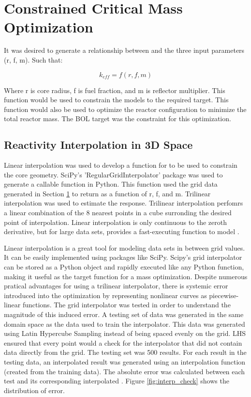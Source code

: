 \section{Constrained Critical Mass Optimization}\label{sec:crit_rad_search}
It was desired to generate a relationship between \keff and the three input
parameters (r, f, m). Such that:

\begin{equation}
    k_{eff} = f(r, f, m)
\label{eq:gen_keff}
\end{equation}

Where r is core radius, f is fuel fraction, and m is reflector multiplier. This
function would be used to constrain the models to the required \keff target.
This function would also be used to optimize the reactor configuration to
minimize the total reactor mass. The BOL \keff target was the constraint for
this optimization.

\subsection{Reactivity Interpolation in 3D Space}
Linear interpolation was used to develop a function for \keff to be used to
constrain the core geometry. SciPy's 'RegularGridInterpolator' package was used
to generate a callable function in Python. This function used the grid data
generated in Section \ref{sec:crit_rad_search} to return \keff as a function of
r, f, and m. Trilinear interpolation was used to estimate the \keff response.
Trilinear interpolation perfomrs a linear combination of the 8 nearest points in
a cube surronding the desired point of interpolation. Linear interpolation is
only continuous to the zeroth derivative, but for large data sets, provides a
fast-executing function to model \keff.

Linear interpolation is a great tool for modeling data sets in between grid
values. It can be easily implemented using packages like SciPy. Scipy's grid
interpolator can be stored as a Python object and rapidly executed like any
Python function, making it useful as the target function for a mass
optimization. Despite numerous pratical advantages for using a trilinear
interpolator, there is systemic error introduced into the optimization by
representing nonlinear curves as piecewise-linear functions. The grid
interpolator was tested in order to understand the magnitude of this induced
error. A testing set of data was generated in the same domain space as the data
used to train the interpolator. This data was generated using Latin Hypercube
Sampling instead of being spaced evenly on the grid. LHS ensured that every
point would a check for the interpolator that did not contain data directly from
the grid. The testing set was 500 \keff results. For each \keff result in the
testing data, an interpolated result was generated using an interpolation
function (created from the training data). The absolute error was calculated
between each test \keff and its corresponding interpolated \keff. Figure
\ref{fig:interp_check} shows the distribution of error.

